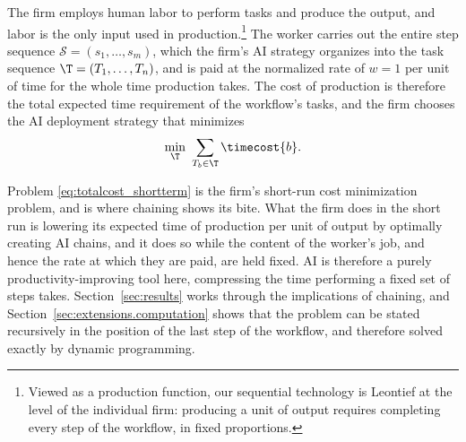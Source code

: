 The firm employs human labor to perform tasks and produce the output, and labor is the only input used in production.\footnote{
Viewed as a production function, our sequential technology is Leontief at the level of the individual firm: producing a unit of output requires completing every step of the workflow, in fixed proportions.
}
The worker carries out the entire step sequence $\mathcal{S} = (s_1, \dotsc, s_m)$, which the firm's AI strategy organizes into the task sequence $\T = (T_1, \dotsc, T_n)$, and is paid at the normalized rate of $w = 1$ per unit of time for the whole time production takes.
The cost of production is therefore the total expected time requirement of the workflow's tasks, and the firm chooses the AI deployment strategy that minimizes
\begin{align}
\label{eq:totalcost_shortterm}
\min_{\T} \ \sum_{T_b \in \T} \timecost{b}.
\end{align}

Problem \eqref{eq:totalcost_shortterm} is the firm's short-run cost minimization problem, and is where chaining shows its bite.
What the firm does in the short run is lowering its expected time of production per unit of output by optimally creating AI chains, and it does so while the content of the worker's job, and hence the rate at which they are paid, are held fixed.
AI is therefore a purely productivity-improving tool here, compressing the time performing a fixed set of steps takes.
Section~\ref{sec:results} works through the implications of chaining, and Section~\ref{sec:extensions.computation} shows that the problem can be stated recursively in the position of the last step of the workflow, and therefore solved exactly by dynamic programming.